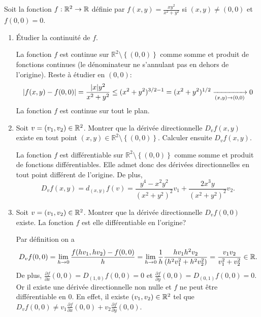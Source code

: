 \documentclass[a4paper]{tp_um}
\begin{document}
		
\exo{}Soit la fonction $f:\mathbb{R}^2 \to \mathbb{R}$ définie par $f(x,y) = \frac{xy^2}{x^2 + y^2}$ si $(x,y) \neq (0,0)$ et $f(0,0) = 0$.
\begin{enumerate}
	\item  \'Etudier la continuité de $f$.

\bigskip
La fonction $f$ est continue sur $\mathbb R^2 \setminus\left\{ (0,0) \right\}$ comme somme et produit de fonctions continues (le dénominateur ne s'annulant pas en dehors de l'origine). Reste à étudier en $(0,0)$:
\[
	\left\lvert f(x,y) - f(0,0) \right\rvert =  \frac{|x|y^2}{x^2 + y^2} \leq (x^2 + y^2)^{3/2 -1} =  (x^2 + y^2)^{1/2} \xrightarrow[(x,y) \to (0,0)]{} 0
\]
La fonction $f$ est continue sur tout le plan.

\bigskip

	\item Soit $v = (v_1,v_2) \in \mathbb{R}^2$. Montrer que la dérivée directionnelle $D_v f(x,y)$ existe en tout point $(x,y)\in\mathbb R^2 \setminus\left\{ (0,0) \right\}$. Calculer ensuite $D_v f(x,y)$.

\bigskip

La fonction $f$ est différentiable sur $ \mathbb R^2 \setminus\left\{ (0,0) \right\}$ comme somme et produit de fonctions différentiables. Elle admet donc des dérivées directionnelles en tout point différent de l'origine. De plus,
\[
	D_v f(x,y) =  d_{(x,y)} f (v) = \frac{y^4 - x^2y^2}{(x^2 + y^2)^2} v_1 +  \frac{2x^3y}{(x^2 + y^2)^2} v_2.
\]
\bigskip

		
	\item Soit $v = (v_1,v_2)  \in \mathbb{R}^2$. Montrer que la dérivée directionnelle $D_v f(0,0)$ existe. La fonction $f$ est elle différentiable en l'origine?

\bigskip

Par définition on a 
\[
	D_v f(0,0) = \lim_{h\to 0} \frac{f(hv_1,hv_2) - f(0,0) }{h} = \lim_{h\to 0} \frac 1 h \frac{ hv_1 h^2 v_2}{(h^2v_1^2 + h^2 v_2^2)} = \frac{v_1v_2}{v_1^2 + v^2_2} \in \mathbb{R}.
\]
De plus, $\frac{\partial{}f}{\partial x}(0,0) = D_{(1,0)} f (0,0)  = 0$ et $\frac{\partial f}{\partial y}(0,0) = D_{(0,1)} f(0,0) = 0$. Or il existe une dérivée directionnelle non nulle et $f$ ne peut être différentiable en 0. En effet, il existe $(v_1,v_2) \in \mathbb{R}^2$ tel que $D_v f(0,0) \neq v_1\frac{\partial f}{\partial x}(0,0) + v_2\frac{\partial f}{\partial y}(0,0)$.  
\bigskip



\end{enumerate}	
	
\end{document}
